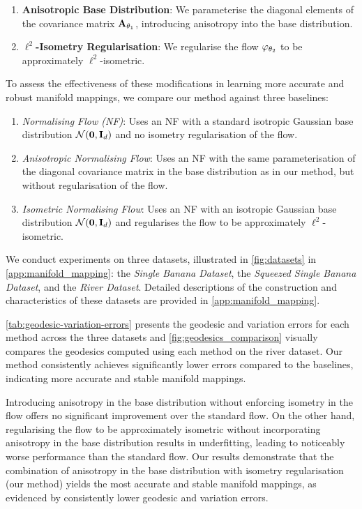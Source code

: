 \begin{enumerate}
    \item \textbf{Anisotropic Base Distribution}: We parameterise the diagonal elements of the covariance matrix \(\mathbf{A}_{\theta_1}\), introducing anisotropy into the base distribution.
    
    \item \textbf{\(\ell^2\)-Isometry Regularisation}: We regularise the flow \(\varphi_{\theta_2}\) to be approximately \(\ell^2\)-isometric.
\end{enumerate}

To assess the effectiveness of these modifications in learning more accurate and robust manifold mappings, we compare our method against three baselines:

\begin{enumerate}[label=(\arabic*)]
    \item \emph{Normalising Flow (NF)}: Uses an NF with a standard isotropic Gaussian base distribution $\mathcal{N}(\mathbf{0}, \mathbf{I}_d)$ and no isometry regularisation of the flow.
    \item \emph{Anisotropic Normalising Flow}: Uses an NF with the same parameterisation of the diagonal covariance matrix in the base distribution as in our method, but without regularisation of the flow.
    \item \emph{Isometric Normalising Flow}: Uses an NF with an isotropic Gaussian base distribution $\mathcal{N}(\mathbf{0}, \mathbf{I}_d)$ and regularises the flow to be approximately $\ell^2$-isometric.
\end{enumerate}

We conduct experiments on three datasets, illustrated in \ref{fig:datasets} in \ref{app:manifold_mapping}: the \emph{Single Banana Dataset}, the \emph{Squeezed Single Banana Dataset}, and the \emph{River Dataset}. Detailed descriptions of the construction and characteristics of these datasets are provided in \ref{app:manifold_mapping}.

\ref{tab:geodesic-variation-errors} presents the geodesic and variation errors for each method across the three datasets and \ref{fig:geodesics_comparison} visually compares the geodesics computed using each method on the river dataset. Our method consistently achieves significantly lower errors compared to the baselines, indicating more accurate and stable manifold mappings. 

Introducing anisotropy in the base distribution without enforcing isometry in the flow offers no significant improvement over the standard flow. On the other hand, regularising the flow to be approximately isometric without incorporating anisotropy in the base distribution results in underfitting, leading to noticeably worse performance than the standard flow. Our results demonstrate that the combination of anisotropy in the base distribution with isometry regularisation (our method) yields the most accurate and stable manifold mappings, as evidenced by consistently lower geodesic and variation errors.

